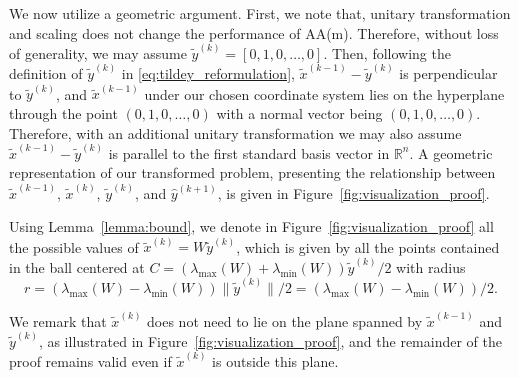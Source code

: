 \documentclass[11pt]{article}
\newcommand{\R}{\mathbb{R}}
\begin{document}
{
We now utilize a geometric argument. First, we note that, unitary transformation and scaling does not change the performance of AA(m). Therefore, without loss of generality, we may assume  $\widetilde{y}^{(k)} = [0,1,0,\hdots,0]$. Then, following the definition of $\widetilde{y}^{(k)}$ in \eqref{eq:tildey_reformulation}, $\widetilde{x}^{(k-1)}-\widetilde{y}^{(k)}$ is perpendicular to $\widetilde{y}^{(k)}$, and $\widetilde{x}^{(k-1)}$ under our chosen coordinate system lies on the hyperplane through the point $(0,1,0,\hdots,0)$ with a normal vector being $(0,1,0,\hdots,0)$. Therefore, with an additional unitary transformation we may also assume $\widetilde{x}^{(k-1)}-\widetilde{y}^{(k)}$ is parallel to the first standard basis vector in $\R^n$. A geometric representation of our transformed problem, presenting the relationship between $\widetilde{x}^{(k-1)}$, $\widetilde{x}^{(k)}$, $\widetilde{y}^{(k)}$, and $\widehat{y}^{(k+1)}$, is given in Figure~\ref{fig:visualization_proof}. 

Using Lemma~\ref{lemma:bound}, we denote in Figure~\ref{fig:visualization_proof} all the possible values of $\widetilde{x}^{(k)}=W \widetilde{y}^{(k)}$, which is given by all the points contained in the ball centered at 
$C=(\lambda_{\max}(W)+\lambda_{\min}(W))\widetilde{y}^{(k)}/2$ with radius
\begin{equation}\label{eq:radius}
r = (\lambda_{\max}(W)-\lambda_{\min}(W))\|\widetilde{y}^{(k)}\|/2=(\lambda_{\max}(W)-\lambda_{\min}(W))/2. 
\end{equation}
}We remark that $\widetilde{x}^{(k)}$ does not need to lie on the plane spanned by $\widetilde{x}^{(k-1)}$ and $\widetilde{y}^{(k)}$, as illustrated in Figure~\ref{fig:visualization_proof}, and the remainder of the proof remains valid even if $\widetilde{x}^{(k)}$ is outside this plane.
\end{document}
